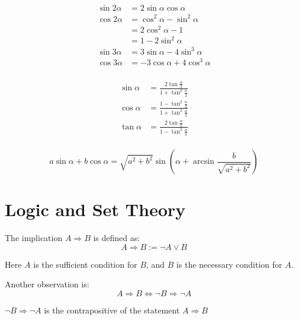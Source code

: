 \begin{theorem}
\begin{equation}
    \begin{aligned}    
        \sin 2\alpha &= 2 \sin\alpha \cos\alpha \\
        \cos 2\alpha &= \cos^2 \alpha - \sin^2 \alpha \\
        &= 2 \cos^2 \alpha - 1 \\
        &= 1 - 2 \sin^2 \alpha \\
        \sin 3\alpha &= 3 \sin\alpha - 4 \sin^3 \alpha \\
        \cos 3\alpha &= -3 \cos\alpha + 4 \cos^3 \alpha \\
    \end{aligned}
\end{equation}

\begin{equation}
    \begin{aligned}       
        \sin \alpha &= \frac{2 \tan \frac{\alpha}{2}}{1 + \tan^2 \frac{\alpha}{2}} \\
        \cos \alpha &= \frac{1 - \tan^2 \frac{\alpha}{2}}{1 + \tan^2 \frac{\alpha}{2}} \\
        \tan \alpha &= \frac{2 \tan \frac{\alpha}{2}}{1 - \tan^2 \frac{\alpha}{2}} \\  
    \end{aligned}
\end{equation}


\begin{equation}
    a \sin\alpha + b \cos\alpha = \sqrt{a^2 + b^2}\sin\left(\alpha + \arcsin\frac{b}{\sqrt{a^2 + b^2}}\right)
\end{equation}

\end{theorem}


\section{Logic and Set Theory}


\begin{definition}    
The implication $A \Rightarrow B$ is defined as:
\begin{equation}
    A \Rightarrow B := \neg A \vee B
\end{equation}

Here $A$ is the sufficient condition for $B$, and $B$ is the necessary condition for $A$.

Another observation is:
\begin{equation}
    A \Rightarrow B \Leftrightarrow \neg B \Rightarrow \neg A
\end{equation}

$\neg B \Rightarrow \neg A$ is the contrapositive of the statement $A \Rightarrow B$
\end{definition}

